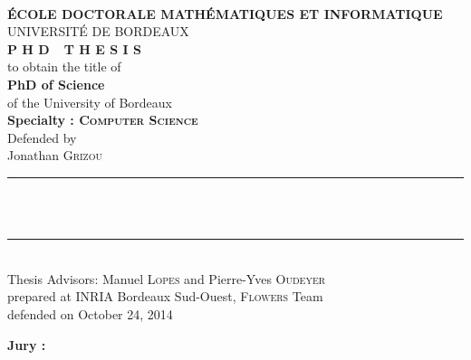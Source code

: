 
\begin{titlepage}
\begin{center}
 \\
\vspace*{0.3cm}
\noindent \textbf{\'ECOLE DOCTORALE MATH\'EMATIQUES ET INFORMATIQUE} \\
\noindent UNIVERSIT\'E DE BORDEAUX \\
\vspace*{0.5cm}
\noindent \Huge \textbf{P H D\ \ T H E S I S} \\
\vspace*{0.3cm}
\noindent \large {to obtain the title of} \\
\vspace*{0.3cm}
\noindent \LARGE \textbf{PhD of Science} \\
\vspace*{0.3cm}
\noindent \Large of the University of Bordeaux \\
\noindent \Large \textbf{Specialty : \textsc{Computer Science}}\\
\vspace*{0.4cm}
\noindent \large {Defended by\\}
\noindent \LARGE Jonathan \textsc{Grizou} \\
\vspace*{0.4cm}
\noindent\rule{10cm}{0.4pt}\\
\vspace*{0.4cm}
\noindent {\huge \textbf{\thesistitle}} \\
\vspace*{0.4cm}
\noindent\rule{10cm}{0.4pt}\\
\vspace*{0.4cm}
\noindent \Large Thesis Advisors: Manuel \textsc{Lopes} and Pierre-Yves \textsc{Oudeyer} \\
\vspace*{0.2cm}
\noindent \Large prepared at INRIA Bordeaux Sud-Ouest, \textsc{Flowers} Team\\
\vspace*{0.2cm}
\noindent \large defended on October 24, 2014 \\
\vspace*{0.5cm}
\end{center}
\noindent \large \textbf{Jury :} \\
\begin{center}
\noindent \large 
\begin{tabular}{llccl}

\end{tabular}
\end{center}
\end{titlepage}

